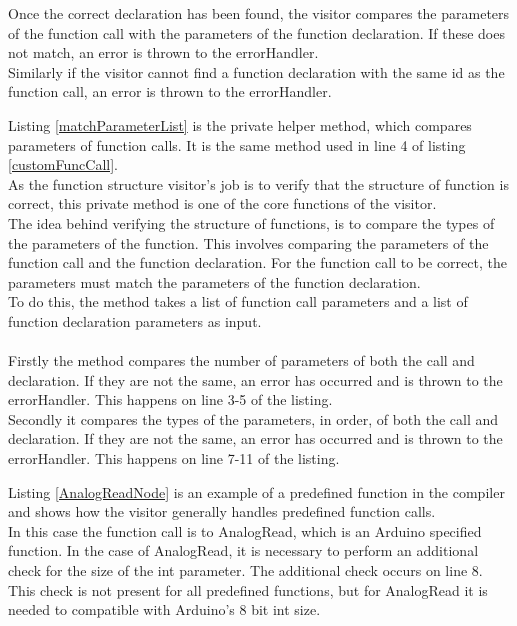 Once the correct declaration has been found, the visitor compares the parameters of the function call with the parameters of the function declaration. If these does not match, an error is thrown to the errorHandler.\\
Similarly if the visitor cannot find a function declaration with the same id as the function call, an error is thrown to the errorHandler.

\noindent\newline
Listing \ref{matchParameterList} is the private helper method, which compares parameters of function calls. It is the same method used in line 4 of listing \ref{customFuncCall}.\\
As the function structure visitor's job is to verify that the structure of function is correct, this private method is one of the core functions of the visitor.\\
The idea behind verifying the structure of functions, is to compare the types of the parameters of the function. This involves comparing the parameters of the function call and the function declaration. For the function call to be correct, the parameters must match the parameters of the function declaration.\\
To do this, the method takes a list of function call parameters and a list of function declaration parameters as input.
\\\\
Firstly the method compares the number of parameters of both the call and declaration. If they are not the same, an error has occurred and is thrown to the errorHandler. This happens on line 3-5 of the listing.\\
Secondly it compares the types of the parameters, in order, of both the call and declaration. If they are not the same, an error has occurred and is thrown to the errorHandler. This happens on line 7-11 of the listing.

\noindent\newline
Listing \ref{AnalogReadNode} is an example of a predefined function in the compiler and shows how the visitor generally handles predefined function calls.\\
In this case the function call is to AnalogRead, which is an Arduino specified function. In the case of AnalogRead, it is necessary to perform an additional check for the size of the int parameter. The additional check occurs on line 8. This check is not present for all predefined functions, but for AnalogRead it is needed to compatible with Arduino's 8 bit int size.
